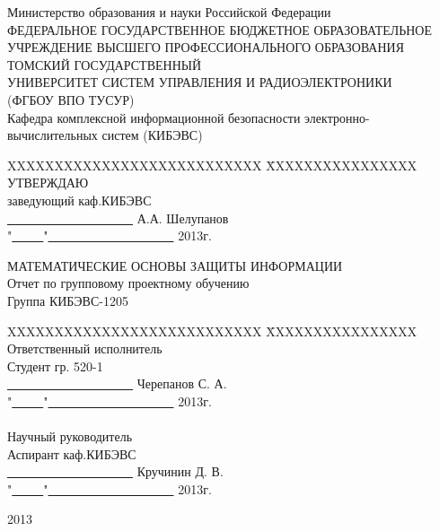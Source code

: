 \documentclass[
russian,
cp1251,
14pt,
simple
]{eskdtext}
\theoremstyle{definition}
\begin{document}
\newpage
{}

\begin{center}
Министерство образования и науки Российской Федерации\\
ФЕДЕРАЛЬНОЕ ГОСУДАРСТВЕННОЕ БЮДЖЕТНОЕ ОБРАЗОВАТЕЛЬНОЕ\\
УЧРЕЖДЕНИЕ ВЫСШЕГО ПРОФЕССИОНАЛЬНОГО ОБРАЗОВАНИЯ\\
ТОМСКИЙ ГОСУДАРСТВЕННЫЙ\\
УНИВЕРСИТЕТ СИСТЕМ УПРАВЛЕНИЯ И РАДИОЭЛЕКТРОНИКИ\\
(ФГБОУ ВПО ТУСУР)\\
Кафедра комплексной информационной безопасности электронно-вычислительных систем (КИБЭВС)\\
\end{center}

\begin{tabbing}
XXXXXXXXXXXXXXXXXXXXXXXXXXX \=
XXXXXXXXXXXXXXXX\kill
\> УТВЕРЖДАЮ\\
\> заведующий каф.КИБЭВС\\
\> \underline{\ \ \ \ \ \ \ \ \ \ \ \ \ \ \ \ \ \ \ \ } А.А. Шелупанов\\
\> "\underline{\ \ \ \ \ }"\underline{\ \ \ \ \ \ \ \ \ \ \ \ \ \ \ \ \ \ \ \ } 2013г.\\
\end{tabbing}

\begin{center}
МАТЕМАТИЧЕСКИЕ ОСНОВЫ ЗАЩИТЫ ИНФОРМАЦИИ\\
Отчет по групповому проектному обучению\\
Группа КИБЭВС-1205\\
\end{center}

\begin{tabbing}
XXXXXXXXXXXXXXXXXXXXXXXXXXX \=
XXXXXXXXXXXXXXXX\kill
\> Ответственный исполнитель\\
\> Студент гр. 520-1\\
\> \underline{\ \ \ \ \ \ \ \ \ \ \ \ \ \ \ \ \ \ \ \ } Черепанов С. А.\\
\> "\underline{\ \ \ \ \ }"\underline{\ \ \ \ \ \ \ \ \ \ \ \ \ \ \ \ \ \ \ \ } 2013г.\\
\ \\
\> Научный руководитель\\
\> Аспирант каф.КИБЭВС\\
\> \underline{\ \ \ \ \ \ \ \ \ \ \ \ \ \ \ \ \ \ \ \ } Кручинин Д. В.\\
\> "\underline{\ \ \ \ \ }"\underline{\ \ \ \ \ \ \ \ \ \ \ \ \ \ \ \ \ \ \ \ } 2013г.\\
\end{tabbing}
\vfill
\begin{center}
2013
\end{center}
\end{document}
